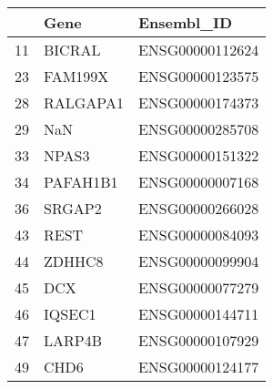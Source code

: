 \begin{tabular}{lll}
\toprule
 & Gene & Ensembl_ID \\
\midrule
11 & BICRAL & ENSG00000112624 \\
23 & FAM199X & ENSG00000123575 \\
28 & RALGAPA1 & ENSG00000174373 \\
29 & NaN & ENSG00000285708 \\
33 & NPAS3 & ENSG00000151322 \\
34 & PAFAH1B1 & ENSG00000007168 \\
36 & SRGAP2 & ENSG00000266028 \\
43 & REST & ENSG00000084093 \\
44 & ZDHHC8 & ENSG00000099904 \\
45 & DCX & ENSG00000077279 \\
46 & IQSEC1 & ENSG00000144711 \\
47 & LARP4B & ENSG00000107929 \\
49 & CHD6 & ENSG00000124177 \\
\bottomrule
\end{tabular}
